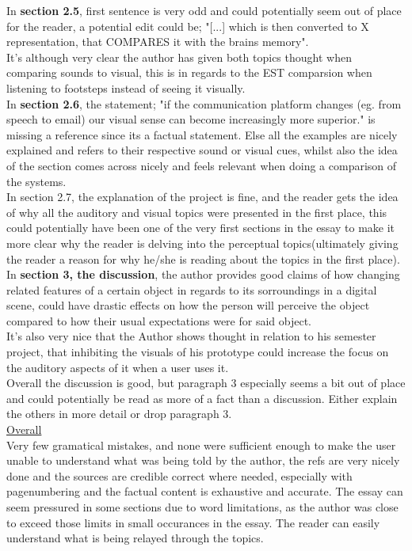 \documentclass{article}
\begin{document}
In \textbf{section 2.5}, first sentence is very odd and could potentially seem out of place for the reader, a potential edit could be; "[...] which is then converted to X representation, that COMPARES it with the brains memory".\\It's although very clear the author has given both topics thought when comparing sounds to visual, this is in regards to the EST comparsion when listening to footsteps instead of seeing it visually.\medskip \\
In \textbf{section 2.6}, the statement; "if the communication platform changes (eg. from speech to email) our visual sense can become increasingly more superior." is missing a reference since its a factual statement. Else all the examples are nicely explained and refers to their respective sound or visual cues, whilst also the idea of the section comes across nicely and feels relevant when doing a comparison of the systems.\medskip \\
In section 2.7, the explanation of the project is fine, and the reader gets the idea of why all the auditory and visual topics were presented in the first place, this could potentially have been one of the very first sections in the essay to make it more clear why the reader is delving into the perceptual topics(ultimately giving the reader a reason for why he/she is reading about the topics in the first place).\medskip \\
In \textbf{section 3, the discussion}, the author provides good claims of how changing related features of a certain object in regards to its sorroundings in a digital scene, could have drastic effects on how the person will perceive the object compared to how their usual expectations were for said object.\\It's also very nice that the Author shows thought in relation to his semester project, that inhibiting the visuals of his prototype could increase the focus on the auditory aspects of it when a user uses it.\\Overall the discussion is good, but paragraph 3 especially seems a bit out of place and could potentially be read as more of a fact than a discussion. Either explain the others in more detail or drop paragraph 3.\medskip \\
\underline{Overall}\\
Very few gramatical mistakes, and none were sufficient enough to make the user unable to understand what was being told by the author, the refs are very nicely done and the sources are credible correct where needed, especially with pagenumbering and the factual content is exhaustive and accurate. The essay can seem pressured in some sections due to word limitations, as the author was close to exceed those limits in small occurances in the essay. The reader can easily understand what is being relayed through the topics.\\
\end{document}
